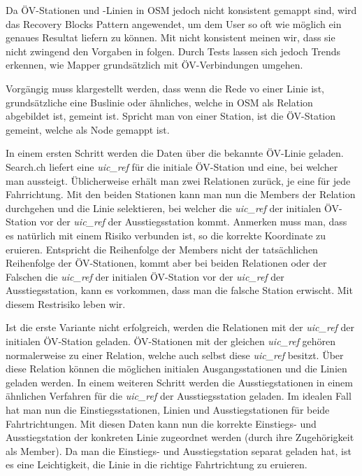 Da ÖV-Stationen und -Linien in \ac{OSM} jedoch nicht konsistent gemappt sind, wird das Recovery Blocks Pattern \cite{fault_tolerant_software} angewendet, um dem User so oft wie möglich ein genaues Resultat liefern zu können. Mit nicht konsistent meinen wir, dass sie nicht zwingend den Vorgaben in \cite{osm_wiki_relation} folgen. Durch Tests lassen sich jedoch Trends erkennen, wie Mapper grundsätzlich mit ÖV-Verbindungen umgehen.

Vorgängig muss klargestellt werden, dass wenn die Rede vo einer Linie ist, grundsätzliche eine Buslinie oder ähnliches, welche in \ac{OSM} als Relation \cite{osm_wiki_relation} abgebildet ist, gemeint ist. Spricht man von einer Station, ist die ÖV-Station gemeint, welche als Node gemappt ist.

In einem ersten Schritt werden die Daten über die bekannte ÖV-Linie geladen. Search.ch \cite{search_ch_route_api} liefert eine \emph{uic\_ref} für die initiale ÖV-Station und eine, bei welcher man aussteigt. Üblicherweise erhält man zwei Relationen zurück, je eine für jede Fahrrichtung. Mit den beiden Stationen kann man nun die Members der Relation durchgehen und die Linie selektieren, bei welcher die \emph{uic\_ref} der initialen ÖV-Station vor der \emph{uic\_ref} der Ausstiegsstation kommt.
Anmerken muss man, dass es natürlich mit einem Risiko verbunden ist, so die korrekte Koordinate zu eruieren. Entspricht die Reihenfolge der Members nicht der tatsächlichen Reihenfolge der ÖV-Stationen, kommt aber bei beiden Relationen oder der Falschen die \emph{uic\_ref} der initialen ÖV-Station vor der \emph{uic\_ref} der Ausstiegsstation, kann es vorkommen, dass man die falsche Station erwischt. Mit diesem Restrisiko leben wir.

Ist die erste Variante nicht erfolgreich, werden die Relationen mit der \emph{uic\_ref} der initialen ÖV-Station geladen. ÖV-Stationen mit der gleichen \emph{uic\_ref} gehören normalerweise zu einer Relation, welche auch selbst diese \emph{uic\_ref} besitzt. Über diese Relation können die möglichen initialen Ausgangsstationen und die Linien geladen werden. In einem weiteren Schritt werden die Ausstiegstationen in einem ähnlichen Verfahren für die \emph{uic\_ref} der Ausstiegsstation geladen. Im idealen Fall hat man nun die Einstiegsstationen, Linien und Ausstiegstationen für beide Fahrtrichtungen. Mit diesen Daten kann nun die korrekte Einstiegs- und Ausstiegstation der konkreten Linie zugeordnet werden (durch ihre Zugehörigkeit als Member). Da man die Einstiegs- und Ausstiegstation separat geladen hat, ist es eine Leichtigkeit, die Linie in die richtige Fahrtrichtung zu eruieren.


